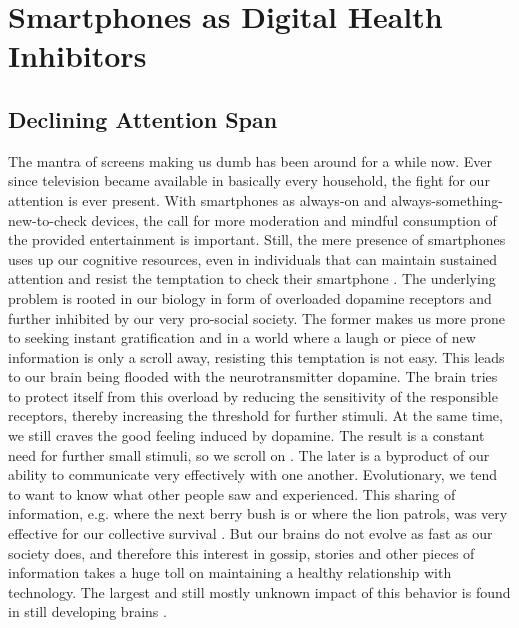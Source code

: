 \section{Smartphones as Digital Health Inhibitors}
\label{sec:smartphoneIssues}
\subsection{Declining Attention Span}
The mantra of screens making us dumb has been around for a while now. Ever since television became available in basically every household, the fight for our attention is ever present. With smartphones as always-on and always-something-new-to-check devices, the call for more moderation and mindful consumption of the provided entertainment is important. Still, the mere presence of smartphones uses up our cognitive resources, even in individuals that can maintain sustained attention and resist the temptation to check their smartphone \cite{ward2017brain}. The underlying problem is rooted in our biology in form of overloaded dopamine receptors and further inhibited by our very pro-social society. The former makes us more prone to seeking instant gratification and in a world where a laugh or piece of new information is only a scroll away, resisting this temptation is not easy. This leads to our brain being flooded with the neurotransmitter dopamine. The brain tries to protect itself from this overload by reducing the sensitivity of the responsible receptors, thereby increasing the threshold for further stimuli. At the same time, we still craves the good feeling induced by dopamine. The result is a constant need for further small stimuli, so we scroll on \cite{nieoullon2002dopamine,dopamineRole}. The later is a byproduct of our ability to communicate very effectively with one another. Evolutionary, we tend to want to know what other people saw and experienced. This sharing of information, e.g. where the next berry bush is or where the lion patrols, was very effective for our collective survival \cite{sapiens}. But our brains do not evolve as fast as our society does, and therefore this interest in gossip, stories and other pieces of information takes a huge toll on maintaining a healthy relationship with technology. The largest and still mostly unknown impact of this behavior is found in still developing brains \cite{crone2018media}.
